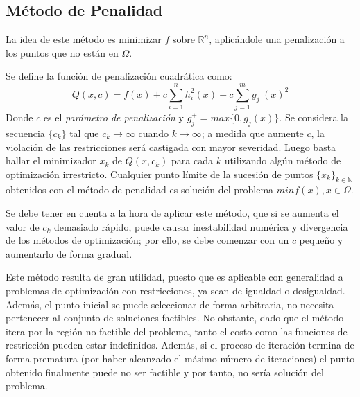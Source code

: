\documentclass[titlepage, 11pt]{scrartcl}
\begin{document}
	\subsection{Método de Penalidad}
	La idea de este método es minimizar $f$ sobre $\mathbb{R}^n$, aplicándole una penalización a los puntos que no están en $\Omega$. 
	
	Se define la función de penalización cuadrática como:
	\begin{equation*}
		Q(x, c) = f(x) + c \sum_{i = 1}^{n}h_i^2(x) + c \sum_{j = 1}^{m}g_j^+(x)^2
	\end{equation*}
	Donde $c$ es el \textit{parámetro de penalización} y $g_j^+ = max\{0, g_j(x)\}$. Se considera la secuencia $\{c_k\}$ tal que $c_k \rightarrow \infty$ cuando $k \rightarrow \infty$; a medida que aumente $c$, la violación de las restricciones será castigada con mayor severidad. Luego basta hallar el minimizador $x_k$ de $Q(x, c_k)$ para cada $k$ utilizando algún método de optimización irrestricto. Cualquier punto límite de la sucesión de puntos $\{x_k\}_{k \in \mathbb{N}}$ obtenidos con el método de penalidad es solución del problema $min f(x), x\in \Omega$.
	
	Se debe tener en cuenta a la hora de aplicar este método, que si se aumenta el valor de $c_k$ demasiado rápido, puede causar inestabilidad numérica y divergencia de los métodos de optimización; por ello, se debe comenzar con un $c$ pequeño y aumentarlo de forma gradual.
	
	Este método resulta de gran utilidad, puesto que es aplicable con generalidad a problemas de optimización con restricciones, ya sean de igualdad o desigualdad. Además, el punto inicial se puede seleccionar de forma arbitraria, no necesita pertenecer al conjunto de soluciones factibles. No obstante, dado que el método itera por la región no factible del problema, tanto el costo como las funciones de restricción pueden estar indefinidos. Además, si el proceso de iteración termina de forma prematura (por haber alcanzado el másimo número de iteraciones) el punto obtenido finalmente puede no ser factible y por tanto, no sería solución del problema.
	
\end{document}
